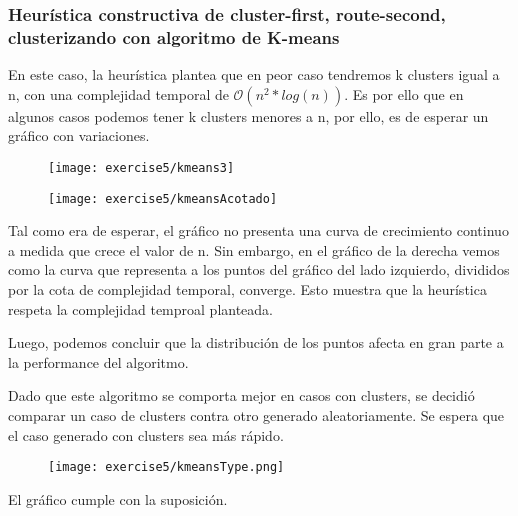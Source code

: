\subsubsection{Heurística constructiva de cluster-first, route-second, clusterizando con algoritmo de K-means}


En este caso, la heurística plantea que en peor caso tendremos k clusters igual a n, con una complejidad temporal de $\mathcal{O}(n^{2} * log(n))$. Es por ello que en algunos casos podemos tener k clusters menores a n, por ello, es de esperar un gráfico con variaciones.

\begin{figure}[H]
	\centering
	\begin{minipage}[t]{.45\textwidth}
		\centering
		\texttt{[image: exercise5/kmeans3]}
	\end{minipage}\qquad
	\begin{minipage}[t]{.45\textwidth}
		\centering
		\texttt{[image: exercise5/kmeansAcotado]}
	\end{minipage}
\end{figure}

Tal como era de esperar, el gráfico no presenta una curva de crecimiento continuo a medida que crece el valor de n. Sin embargo, en el gráfico de la derecha vemos como la curva que representa a los puntos del gráfico del lado izquierdo, divididos por la cota de complejidad temporal, converge. Esto muestra que la heurística respeta la complejidad temproal planteada.

Luego, podemos concluir que la distribución de los puntos afecta en gran parte a la performance del algoritmo.



Dado que este algoritmo se comporta mejor en casos con clusters, se decidió comparar un caso de clusters contra otro generado aleatoriamente. Se espera que el caso generado con clusters sea más rápido.

\begin{figure}[H]
	\centering
	\texttt{[image: exercise5/kmeansType.png]}
\end{figure}

El gráfico cumple con la suposición.